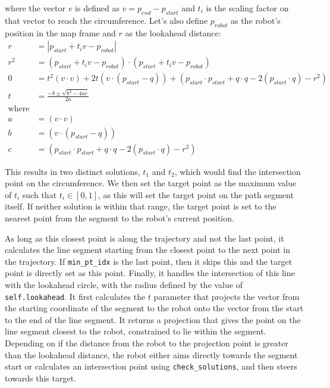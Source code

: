 \documentclass{article}
\begin{document}
where the vector $v$ is defined as $v=p_{end}-p_{start}$ and $t_i$ is the scaling factor on that vector to reach the circumference. Let's also define $p_{robot}$ as the robot's position in the map frame and $r$ as the lookahead distance:
\begin{align*}
    r &= |p_{start} + t_i v - p_{robot}|\\
    r^2 &= (p_{start} + t_i v - p_{robot})\cdot (p_{start} + t_i v - p_{robot})\\
    0 &= t^2(v\cdot v) + 2t(v\cdot (p_{start}-q)) + (p_{start}\cdot p_{start} + q\cdot q - 2(p_{start}\cdot q) -r^2)\\
    t &= \frac{-b \pm \sqrt{b^2 - 4ac}}{2a}\\
    \text{where}\\
    a &= (v\cdot v)\\
    b &= (v\cdot (p_{start}-q))\\
    c &= (p_{start}\cdot p_{start} + q\cdot q - 2(p_{start}\cdot q) -r^2)
\end{align*}

This results in two distinct solutions, $t_1$ and $t_2$, which would find the intersection point on the circumference. We then set the target point as the maximum value of $t_i$ such that $t_i\in [0, 1]$, as this will set the target point on the path segment itself. If neither solution is within that range, the target point is set to the nearest point from the segment to the robot's current position.

As long as this closest point is along the trajectory and not the last point, it calculates the line segment starting from the closest point to the next point in the trajectory. If \texttt{min\_pt\_idx} is the last point, then it skips this and the target point is directly set as this point. Finally, it handles the intersection of this line with the lookahead circle, with the radius defined by the value of \texttt{self.lookahead}. It first calculates the $t$ parameter that projects the vector from the starting coordinate of the segment to the robot onto the vector from the start to the end of the line segment. It returns a projection that gives the point on the line segment closest to the robot, constrained to lie within the segment. Depending on if the distance from the robot to the projection point is greater than the lookahead distance, the robot either aims directly towards the segment start or calculates an intersection point using \texttt{check\_solutions}, and then steers towards this target.
\end{document}
